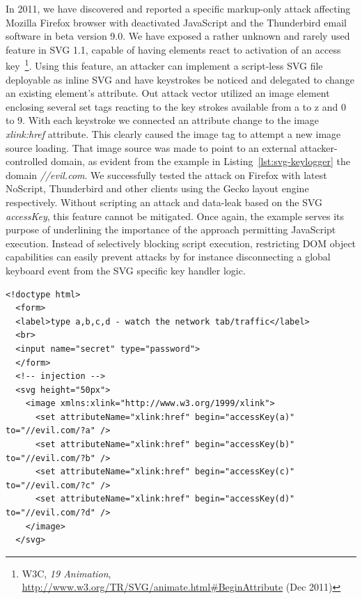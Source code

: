       In 2011, we have discovered and reported a specific markup-only attack affecting Mozilla Firefox browser with deactivated JavaScript and the Thunderbird email software in beta version 9.0. We have exposed a rather unknown and rarely used feature in SVG 1.1, capable of having elements react to activation of an access key~\footnote{W3C, \textit{19 Animation}, \url{http://www.w3.org/TR/SVG/animate.html#BeginAttribute} (Dec 2011)}. Using this feature, an attacker can implement a script-less SVG file deployable as inline SVG and have keystrokes be noticed and delegated to change an existing element's attribute. Out attack vector utilized an image element enclosing several set tags reacting to the key strokes available from a to z and 0 to 9. With each keystroke we connected an attribute change to the image \textit{xlink:href} attribute. This clearly caused the image tag to attempt a new image source loading. That image source was made to point to an external attacker-controlled domain, as evident from the example in Listing~\ref{lst:svg-keylogger} the domain \textit{//evil.com}. We successfully tested the attack on Firefox with latest NoScript, Thunderbird and other clients using the Gecko layout engine respectively. Without scripting an attack and data-leak based on the SVG \textit{accessKey}, this feature cannot be mitigated. Once again, the example serves its purpose of underlining the importance of the approach permitting JavaScript execution. Instead of selectively blocking script execution, restricting DOM object capabilities can easily prevent attacks by for instance disconnecting a global keyboard event from the SVG specific key handler logic.

\begin{lstlisting}[captionpos=b,caption=Using SVG to sniff keystrokes w/o JavaScript; the SVG accessKey() feature combined with image source changes leaks sensitive data, label=lst:svg-keylogger]
<!doctype html>
  <form>
  <label>type a,b,c,d - watch the network tab/traffic</label>
  <br>
  <input name="secret" type="password">
  </form>
  <!-- injection -->
  <svg height="50px">
    <image xmlns:xlink="http://www.w3.org/1999/xlink">
      <set attributeName="xlink:href" begin="accessKey(a)" to="//evil.com/?a" />
      <set attributeName="xlink:href" begin="accessKey(b)" to="//evil.com/?b" />
      <set attributeName="xlink:href" begin="accessKey(c)" to="//evil.com/?c" />
      <set attributeName="xlink:href" begin="accessKey(d)" to="//evil.com/?d" />
    </image>
  </svg>
\end{lstlisting}

